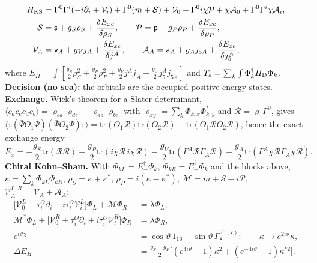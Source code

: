 \documentclass[10pt,a4paper]{article}
\begin{document}
\begin{align*}
H_{\rm KS}&=\Gamma^0\Gamma^i(-i\partial_i+\mathcal V_i)+\Gamma^0(m+\mathcal S)+\mathcal V_0+\Gamma^0i\chi\mathcal P+\chi\mathcal A_0+\Gamma^0\Gamma^i\chi\mathcal A_i, \\
\mathcal S&=\mathsf s+g_S\rho_S+\frac{\delta E_{xc}}{\delta\rho_S},\qquad \mathcal P=\mathsf p+g_P\rho_P+\frac{\delta E_{xc}}{\delta\rho_P}, \\
\mathcal V_A&=\mathsf v_A+g_Vj_A+\frac{\delta E_{xc}}{\delta j^A},\qquad \mathcal A_A=\mathsf a_A+g_Aj_{5A}+\frac{\delta E_{xc}}{\delta j_5^A},
\end{align*}
where $E_H=\int[\frac{g_S}2\rho_S^2+\frac{g_P}2\rho_P^2+\frac{g_V}2j^Aj_A+\frac{g_A}2j_5^Aj_{5A}]$ and $T_s=\sum_k\int\Phi_k^\dagger H_{\rm D}\Phi_k$. \textbf{Decision (no sea):} the orbitals are the occupied positive-energy states. \textbf{Exchange.} Wick’s theorem for a Slater determinant, $\langle c_a^\dagger c_c^\dagger c_dc_b\rangle=\varrho_{ba}\varrho_{dc}-\varrho_{da}\varrho_{bc}$ with $\varrho_{xy}=\sum_k\Phi_{k,x}\Phi_{k,y}^*$ and $\mathcal R=\varrho\,\Gamma^0$, gives $\langle:(\bar\Psi O_1\Psi)(\bar\Psi O_2\Psi):\rangle=\mathrm{tr}(O_1\mathcal R)\mathrm{tr}(O_2\mathcal R)-\mathrm{tr}(O_1\mathcal RO_2\mathcal R)$, hence the exact exchange energy
\begin{equation*}
E_x=-\frac{g_S}2\mathrm{tr}(\mathcal R\mathcal R)-\frac{g_P}2\mathrm{tr}(i\chi\mathcal R\,i\chi\mathcal R)-\frac{g_V}2\mathrm{tr}(\Gamma^{A}\mathcal R\Gamma_A\mathcal R)-\frac{g_A}2\mathrm{tr}(\Gamma^{A}\chi\mathcal R\Gamma_A\chi\mathcal R).
\end{equation*}
\textbf{Chiral Kohn–Sham.} With $\Phi_{kL}=E_-^\dagger\Phi_k$, $\Phi_{kR}=E_+^\dagger\Phi_k$ and the blocks above, $\kappa=\sum_k\Phi_{kL}^\dagger\Phi_{kR}$, $\rho_S=\kappa+\kappa^*$, $\rho_P=i(\kappa-\kappa^*)$, $\mathcal M=m+\mathcal S+i\mathcal P$, $\mathcal V^{L,R}_A=\mathcal V_A\mp\mathcal A_A$:
\begin{align*}
\big[\mathcal V^L_0-\tau^{O}_i\partial_i-i\tau^{O}_i\mathcal V^L_i\big]\Phi_L+\mathcal M\Phi_R&=\lambda\Phi_L, \\
\mathcal M^*\Phi_L+\big[\mathcal V^R_0+\tau^{O}_i\partial_i+i\tau^{O}_i\mathcal V^R_i\big]\Phi_R&=\lambda\Phi_R, \\
e^{i\vartheta\chi}&=\cos\vartheta\,1_{16}-\sin\vartheta\,\Gamma^{(1,7)}_8:\qquad \kappa\to e^{2i\vartheta}\kappa, \\
\Delta E_H&=\frac{g_S-g_P}2\big[(e^{4i\vartheta}-1)\kappa^2+(e^{-4i\vartheta}-1)\kappa^{*2}\big].
\end{align*}
\end{document}
